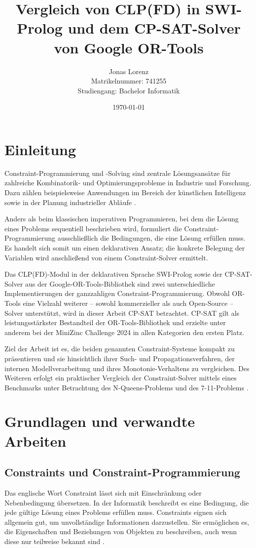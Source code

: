 \documentclass[12pt,a4paper]{article}
\title{Vergleich von CLP(FD) in SWI-Prolog und dem CP-SAT-Solver von Google OR-Tools}
\author{Jonas Lorenz\\Matrikelnummer: 741255\\Studiengang: Bachelor Informatik}
\date{\today}
\begin{document}
\maketitle
\thispagestyle{empty}

\newpage

\tableofcontents
\thispagestyle{empty}
\newpage


\section{Einleitung}
\label{sec:einleitung}
Constraint-Programmierung und -Solving sind zentrale Lösungsansätze für zahlreiche Kombinatorik- und Optimierungsprobleme in Industrie und Forschung.
Dazu zählen beispielsweise Anwendungen im Bereich der künstlichen Intelligenz \cite{popescu2022} sowie in der Planung industrieller Abläufe \cite{clp_book}.

Anders als beim klassischen imperativen Programmieren, bei dem die Lösung eines Problems sequentiell beschrieben wird, formuliert die Constraint-Programmierung ausschließlich die Bedingungen, die eine Lösung erfüllen muss.
Es handelt sich somit um einen deklarativen Ansatz; die konkrete Belegung der Variablen wird anschließend von einem Constraint-Solver ermittelt.

Das CLP(FD)-Modul in der deklarativen Sprache SWI-Prolog sowie der CP-SAT-Solver aus der Google-OR-Tools-Bibliothek sind zwei unterschiedliche Implementierungen der ganzzahligen Constraint-Programmierung.
Obwohl OR-Tools eine Vielzahl weiterer -- sowohl kommerzieller als auch Open-Source -- Solver unterstützt, wird in dieser Arbeit CP-SAT betrachtet.
CP-SAT gilt als leistungsstärkster Bestandteil der OR-Tools-Bibliothek und erzielte unter anderem bei der MiniZinc Challenge 2024 \cite{minizinc2024,perron} in allen Kategorien den ersten Platz.

Ziel der Arbeit ist es, die beiden genannten Constraint-Systeme kompakt zu präsentieren und sie hinsichtlich ihrer Such- und Propagationsverfahren, der internen Modellverarbeitung und ihres Monotonie-Verhaltens zu vergleichen.
Des Weiteren erfolgt ein praktischer Vergleich der Constraint-Solver mittels eines Benchmarks unter Betrachtung des N-Queens-Problems \cite{nqueens} und des 7-11-Problems \cite{seven_eleven}. 

\section{Grundlagen und verwandte Arbeiten}
\subsection{Constraints und Constraint-Programmierung}
Das englische Wort \glqq Constraint\grqq{} lässt sich mit Einschränkung oder Nebenbedingung übersetzen.
In der Informatik beschreibt es eine Bedingung, die jede gültige Lösung eines Problems erfüllen muss.
Constraints eignen sich allgemein gut, um unvollständige Informationen darzustellen.
Sie ermöglichen es, die Eigenschaften und Beziehungen von Objekten zu beschreiben, auch wenn diese nur teilweise bekannt sind \cite{clp_book}.
\end{document}
